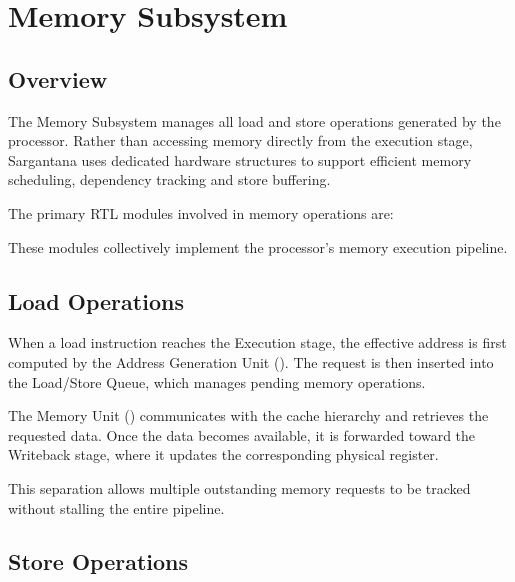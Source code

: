\chapter{Memory Subsystem}

\section{Overview}

The Memory Subsystem manages all load and store operations generated by the processor.
Rather than accessing memory directly from the execution stage, Sargantana uses dedicated
hardware structures to support efficient memory scheduling, dependency tracking and store
buffering.

The primary RTL modules involved in memory operations are:

\begin{rtlrefs}
\end{rtlrefs}

These modules collectively implement the processor's memory execution pipeline.

\section{Load Operations}

When a load instruction reaches the Execution stage, the effective address is first computed by
the Address Generation Unit (). The request is then inserted into the Load/Store
Queue, which manages pending memory operations.

The Memory Unit () communicates with the cache hierarchy and retrieves the
requested data. Once the data becomes available, it is forwarded toward the Writeback stage,
where it updates the corresponding physical register.

This separation allows multiple outstanding memory requests to be tracked without stalling the
entire pipeline.

\section{Store Operations}

